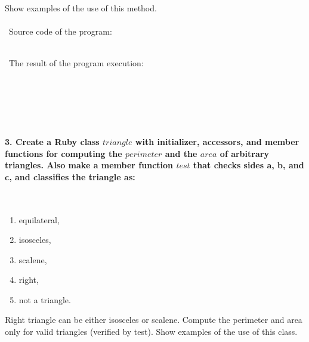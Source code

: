 \documentclass{article}
\begin{document}
	Show examples of the use of this method.

\paragraph{}\	
Source code of the program:

\begin{verbatim} 

\end{verbatim}	

\paragraph{}\
	The result of the program execution:
	
\begin{verbatim} 

\end{verbatim}
	
\paragraph{}\
\paragraph{}\

\paragraph{3. Create a Ruby class \(triangle\) with initializer, accessors, and member functions for computing the \(perimeter\) and the \(area\) of arbitrary triangles. Also make a member function \(test\) that checks sides a, b, and c, and classifies the triangle as: }\

\begin{enumerate}[label=(\arabic*)]
	\item equilateral,
	\item isosceles,
	\item scalene,
	\item right,
	\item not a triangle.
\end{enumerate}

Right triangle can be either isosceles or scalene. Compute the perimeter and area only for valid triangles (verified by test). Show examples of the use of this class.

\paragraph{}\
\end{document}
